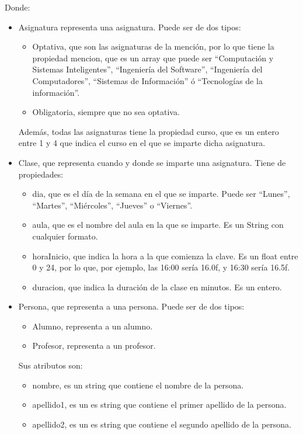 \documentclass[11pt,a4paper]{article}
\begin{document}
Donde:
\begin{itemize}
\item Asignatura representa una asignatura. Puede ser de dos tipos:
\begin{itemize}
\item Optativa, que son las asignaturas de la mención, por lo que tiene la propiedad mencion, que es un array que puede ser ``Computación y Sistemas Inteligentes'', ``Ingeniería del Software'', ``Ingeniería del Computadores'', ``Sistemas de Información'' ó ``Tecnologías de la información''.
\item Obligatoria, siempre que no sea optativa. 
\end{itemize}
Además, todas las asignaturas tiene la propiedad curso, que es un entero entre 1 y 4 que indica el curso en el que se imparte dicha asignatura.
\item Clase, que representa cuando y donde se imparte una asignatura. Tiene de propiedades:
\begin{itemize}
\item dia, que es el día de la semana en el que se imparte. Puede ser ``Lunes'', ``Martes'', ``Miércoles'', ``Jueves'' o ``Viernes''.
\item aula, que es el nombre del aula en la que se imparte. Es un String con cualquier formato.
\item horaInicio, que indica la hora a la que comienza la clave. Es un float entre 0 y 24, por lo que, por ejemplo, las 16:00 sería 16.0f, y 16:30 sería 16.5f.
\item duracion, que indica la duración de la clase en minutos. Es un entero.
\end{itemize}
\item Persona, que representa a una persona. Puede ser de dos tipos:
\begin{itemize}
\item Alumno, representa a un alumno.
\item Profesor, representa a un profesor.
\end{itemize} 
Sus atributos son:
\begin{itemize}
\item nombre, es un string que contiene el nombre de la persona.
\item apellido1, es un es string que contiene el primer apellido de la persona.
\item apellido2, es un es string que contiene el segundo apellido de la persona.
\end{itemize}
\end{itemize}
\end{document}
